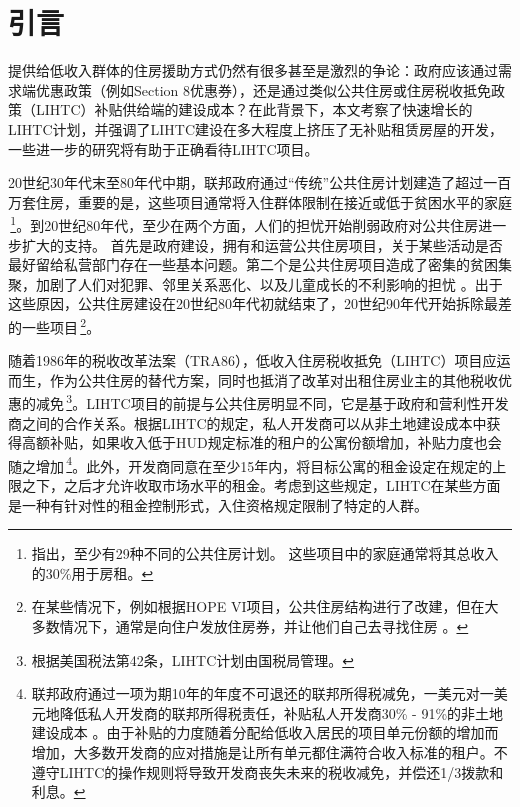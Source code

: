 \documentclass[lang=cn,11pt,a4paper]{paper}
\begin{document}
\section{引言}

提供给低收入群体的住房援助方式仍然有很多甚至是激烈的争论：政府应该通过需求端优惠政策（例如Section 8优惠券），还是通过类似公共住房或住房税收抵免政策（LIHTC）补贴供给端的建设成本？在此背景下，本文考察了快速增长的LIHTC计划，并强调了LIHTC建设在多大程度上挤压了无补贴租赁房屋的开发，一些进一步的研究将有助于正确看待LIHTC项目。

20世纪30年代末至80年代中期，联邦政府通过“传统”公共住房计划建造了超过一百万套住房，重要的是，这些项目通常将入住群体限制在接近或低于贫困水平的家庭 \citep{Olsen2003365}\,\footnote{\cite{Olsen2003365}指出，至少有29种不同的公共住房计划。 这些项目中的家庭通常将其总收入的30\%用于房租。}。到20世纪80年代，至少在两个方面，人们的担忧开始削弱政府对公共住房进一步扩大的支持。 首先是政府建设，拥有和运营公共住房项目，关于某些活动是否最好留给私营部门存在一些基本问题。第二个是公共住房项目造成了密集的贫困集聚，加剧了人们对犯罪、邻里关系恶化、以及儿童成长的不利影响的担忧 \citep{Currie200099,Jencks1990111}。出于这些原因，公共住房建设在20世纪80年代初就结束了，20世纪90年代开始拆除最差的一些项目\,\footnote{在某些情况下，例如根据HOPE VI项目，公共住房结构进行了改建，但在大多数情况下，通常是向住户发放住房券，并让他们自己去寻找住房 \citep{Jacob2004233}。}。

随着1986年的税收改革法案（TRA86），低收入住房税收抵免（LIHTC）项目应运而生，作为公共住房的替代方案，同时也抵消了改革对出租住房业主的其他税收优惠的减免\citep{USCongress1987}\,\footnote{根据美国税法第42条，LIHTC计划由国税局管理。}。LIHTC项目的前提与公共住房明显不同，它是基于政府和营利性开发商之间的合作关系。根据LIHTC的规定，私人开发商可以从非土地建设成本中获得高额补贴，如果收入低于HUD规定标准的租户的公寓份额增加，补贴力度也会随之增加\,\footnote{联邦政府通过一项为期10年的年度不可退还的联邦所得税减免，一美元对一美元地降低私人开发商的联邦所得税责任，补贴私人开发商30\% - 91\%的非土地建设成本 \cite{Eriksen2009141}。由于补贴的力度随着分配给低收入居民的项目单元份额的增加而增加，大多数开发商的应对措施是让所有单元都住满符合收入标准的租户。不遵守LIHTC的操作规则将导致开发商丧失未来的税收减免，并偿还1/3拨款和利息。}。此外，开发商同意在至少15年内，将目标公寓的租金设定在规定的上限之下，之后才允许收取市场水平的租金。考虑到这些规定，LIHTC在某些方面是一种有针对性的租金控制形式，入住资格规定限制了特定的人群。
\end{document}
